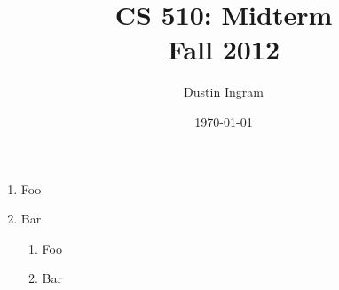 \documentclass{article}
\title{CS 510: Midterm\\Fall 2012}
\author{Dustin Ingram}
\date{\today}
\begin{document}
\maketitle

\begin{enumerate}

\item{Foo}

\item{Bar}

\begin{enumerate}

\item{Foo}

\item{Bar}

\end{enumerate}

\end{enumerate}

\item
\end{document}
